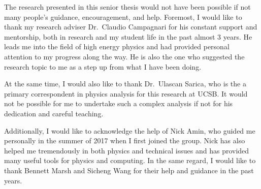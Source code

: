 \begin{acknowledgements}

    The research presented in this senior thesis would not have been possible if not many people's guidance, encouragement, and help. Foremost, I 
    would like to thank my research adviser Dr.\ Claudio Campagnari for his constant support and mentorship, both in research and my student life in the past almost 3 years. He leads me into the field of high energy physics and had provided personal attention to my progress along the way.
    He is also the one who suggested the research topic to me as a step up from
    what I have been doing.

    At the same time, I would also like to thank Dr.\ Ulascan Sarica, who is the 
    a primary correspondent in physics analysis for this research at UCSB. It would 
    not be possible for
    me to undertake such a complex analysis if not for his dedication and careful
    teaching.

    Additionally, I would like to acknowledge the help of Nick Amin, who guided me personally in the summer of 2017 when I first joined the group. Nick has also helped me tremendously in both physics and technical issues and has provided many useful tools for physics and computing. In the same regard, I would like to thank 
    Bennett Marsh and Sicheng Wang for their help and guidance in the past years.


\end{acknowledgements} 

